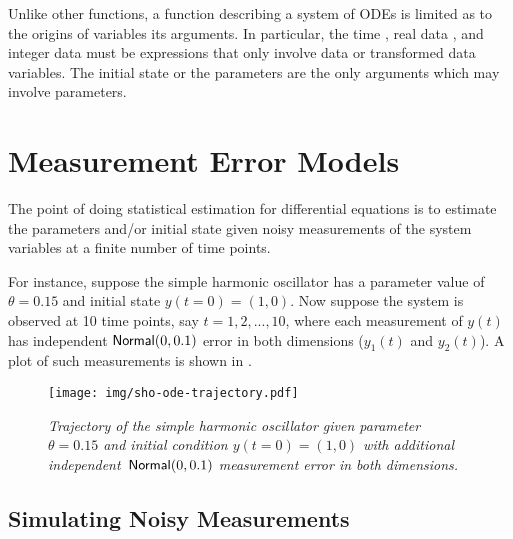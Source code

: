 Unlike other functions, a function describing a system of ODEs is
limited as to the origins of variables its arguments.  In particular,
the time , real data , and integer data 
must be expressions that only involve data or transformed data
variables.  The initial state  or the parameters 
are the only arguments which may involve parameters.


\section{Measurement Error Models}

The point of doing statistical estimation for differential equations
is to estimate the parameters and/or initial state given noisy
measurements of the system variables at a finite number of time
points.

For instance, suppose the simple harmonic oscillator has a parameter
value of $\theta = 0.15$ and initial state $y(t=0) = (1,0)$.  Now
suppose the system is observed at 10 time points, say $t=1, 2, ...,
10$, where each measurement of $y(t)$ has independent
$\mbox{\sf Normal}(0, 0.1)$ error in both dimensions ($y_1(t)$ and
$y_2(t)$).  A plot of such measurements is shown in
.
%
\begin{figure}
\begin{center}
\texttt{[image: img/sho-ode-trajectory.pdf]}%
\end{center}
\vspace*{-0.25in}
\caption{\small\it Trajectory of the simple harmonic oscillator given
  parameter $\theta=0.15$ and initial condition $y(t=0) = (1,0)$ with
  additional independent\ $\mbox{\sf Normal}(0,0.1)$ measurement error
  in both dimensions.}%
\label{sho-trajectory.figure}
\end{figure}



\subsection{Simulating Noisy Measurements}

